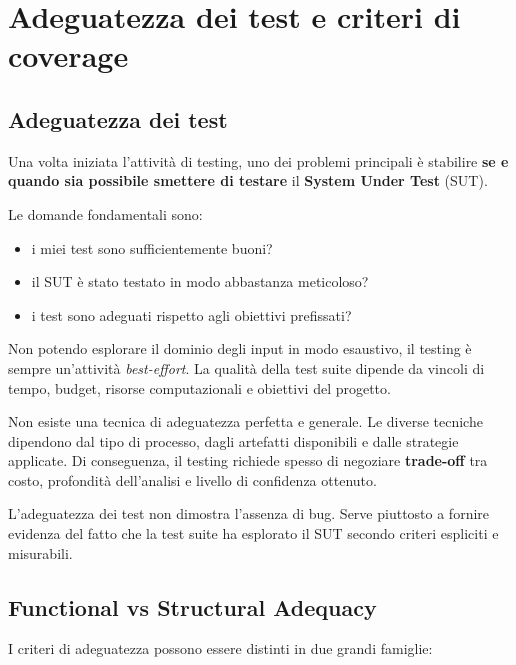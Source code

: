 \chapter{Adeguatezza dei test e criteri di coverage}

\section{Adeguatezza dei test}

Una volta iniziata l'attività di testing, uno dei problemi principali è stabilire \textbf{se e quando sia possibile smettere di testare} il \textbf{System Under Test} (SUT).

Le domande fondamentali sono:

\begin{itemize}
    \item i miei test sono sufficientemente buoni?
    \item il SUT è stato testato in modo abbastanza meticoloso?
    \item i test sono adeguati rispetto agli obiettivi prefissati?
\end{itemize}

\begin{notaprof}
Non potendo esplorare il dominio degli input in modo esaustivo, il testing è sempre un'attività \emph{best-effort}. La qualità della test suite dipende da vincoli di tempo, budget, risorse computazionali e obiettivi del progetto.
\end{notaprof}

Non esiste una tecnica di adeguatezza perfetta e generale. Le diverse tecniche dipendono dal tipo di processo, dagli artefatti disponibili e dalle strategie applicate. Di conseguenza, il testing richiede spesso di negoziare \textbf{trade-off} tra costo, profondità dell'analisi e livello di confidenza ottenuto.

\begin{notaesame}
L'adeguatezza dei test non dimostra l'assenza di bug. Serve piuttosto a fornire evidenza del fatto che la test suite ha esplorato il SUT secondo criteri espliciti e misurabili.
\end{notaesame}

\section{Functional vs Structural Adequacy}

I criteri di adeguatezza possono essere distinti in due grandi famiglie:

